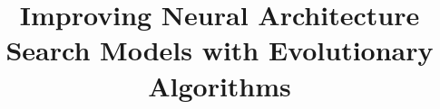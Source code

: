 \documentclass[runningheads]{llncs}
\begin{document}
%

\title{Improving Neural Architecture Search Models with Evolutionary Algorithms}




%
%
\author{ }


%
\authorrunning{ }
%
\end{document}
